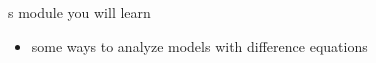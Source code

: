s module you will learn
\begin{itemize}
	\item some ways to analyze models with difference equations
\end{itemize}

\hfill \\


